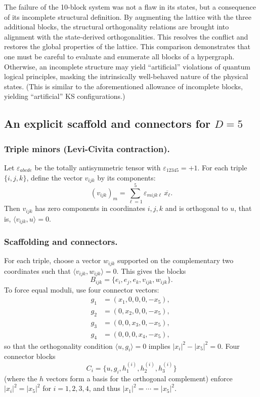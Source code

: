 \documentclass[%
  reprint,
  superscriptaddress,
  showpacs,
  showkeys,
  amsmath,amssymb,
  pra,
  longbibliography,
  floatfix,
  x11names
]{revtex4-2}
\begin{document}
The failure of the 10-block system was not a flaw in its states, but a consequence of its incomplete structural definition.
By augmenting the lattice with the three additional blocks, the structural orthogonality relations
are brought into alignment with the state-derived orthogonalities.
 This resolves the conflict and restores the global properties of the lattice.
This comparison demonstrates that one must be careful to evaluate and enumerate all blocks of a hypergraph.
Otherwise, an incomplete structure may yield ``artificial'' violations of quantum logical principles,
masking the intrinsically well-behaved nature of the physical states.
(This is similar to the aforementioned allowance of incomplete blocks, yielding ``artificial'' KS configurations.)


\subsection{An explicit scaffold and connectors for $D=5$}

\subsubsection{Triple minors (Levi-Civita contraction).}
Let $\varepsilon_{abcde}$ be the totally antisymmetric tensor with $\varepsilon_{12345}=+1$. For each triple $\{i,j,k\}$, define the vector $v_{ijk}$ by its components:
\[
(v_{ijk})_m = \sum_{\ell=1}^5 \varepsilon_{mijk\ell}\,\overline{x_\ell}.
\]
Then $v_{ijk}$ has zero components in coordinates $i,j,k$ and is orthogonal to $u$, that is, $\langle v_{ijk},u\rangle=0$.

\subsubsection{Scaffolding and connectors.}
For each triple, choose a vector $w_{ijk}$ supported on the complementary two coordinates such that $\langle v_{ijk},w_{ijk}\rangle=0$. This gives the blocks
\[
B_{ijk}=\{e_i, e_j, e_k, v_{ijk}, w_{ijk}\}.
\]
To force equal moduli, use four connector vectors:
\begin{align*}
g_1&=(x_1,0,0,0,-x_5),\;\\
g_2&=(0,x_2,0,0,-x_5),\;\\
g_3&=(0,0,x_3,0,-x_5),\;\\
g_4&=(0,0,0,x_4,-x_5),
\end{align*}
so that the orthogonality condition $\langle u,g_i\rangle=0$ implies $|x_i|^2-|x_5|^2=0$. Four connector blocks
\[
C_i=\{u, g_i, h^{(i)}_1, h^{(i)}_2, h^{(i)}_3\}
\]
(where the $h$ vectors form a basis for the orthogonal complement) enforce $|x_i|^2=|x_5|^2$ for $i=1,2,3,4$, and thus $|x_1|^2=\cdots=|x_5|^2$.
\end{document}
